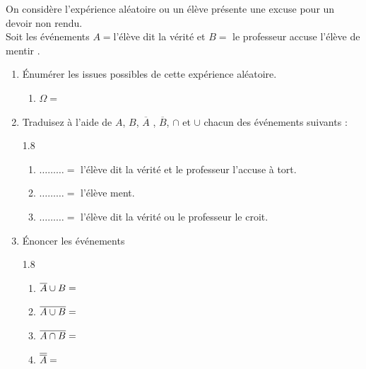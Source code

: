 \documentclass[main.tex]{subfiles}
\begin{document}
\begin{exercise} 
	On considère l'expérience aléatoire ou un élève présente une excuse pour un devoir non rendu.\\
	Soit les événements $A =$\og l'élève dit la vérité \fg{} et $B=$  \og le professeur accuse l'élève de mentir \fg{}. 
	\begin{enumerate}[label=\arabic*),leftmargin=*]
		\item Énumérer les issues possibles de cette expérience aléatoire.
		\begin{enumerate}[label={},leftmargin=*]
			\item $\Omega=$\dotfill   
		\end{enumerate}
		\item Traduisez à l'aide de $A$, $B$, $\overline{A}$ , $\overline{B}$, $\cap$ et $\cup$ chacun des événements suivants :
		\vspace{-0.5em}
		\begin{spacing}{1.8}
		\begin{enumerate}[label={},leftmargin=*] 
			\item  $\ldots\ldots\ldots=$ \og l'élève dit la vérité et le professeur l'accuse à tort\fg.
			\item  $\ldots\ldots\ldots=$ \og  l'élève ment\fg.
			\item  $\ldots\ldots\ldots=$ \og  l'élève dit la vérité ou le professeur le croit\fg.
		\end{enumerate}  
\end{spacing} 
\vspace{-0.5em}
		\item Énoncer les événements 
\vspace{-0.5em}
\begin{spacing}{1.8}
		\begin{enumerate}[label={},leftmargin=*] 
			\item $\overline{A}\cup B=\dotfill$ 
			\item $\overline{A\cup B}=\dotfill$ 
			\item $\overline{A\cap B}=\dotfill$ 
			\item $\overline{\overline{A}}=\dotfill$  
		\end{enumerate} 
	\vspace{-1.5em}
\end{spacing}  
\end{enumerate}
\end{exercise} 
\end{document}
